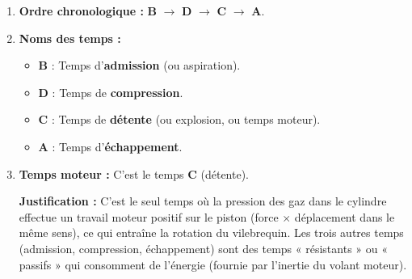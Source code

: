 \documentclass[11pt]{article}
\begin{document}
\begin{corrige}
\begin{enumerate}
\item \textbf{Ordre chronologique :} \textbf{B} $\rightarrow$ \textbf{D} $\rightarrow$ \textbf{C} $\rightarrow$ \textbf{A}.
\item \textbf{Noms des temps :}
      \begin{itemize}
      \item \textbf{B} : Temps d'\textbf{admission} (ou aspiration).
      \item \textbf{D} : Temps de \textbf{compression}.
      \item \textbf{C} : Temps de \textbf{détente} (ou explosion, ou temps moteur).
      \item \textbf{A} : Temps d'\textbf{échappement}.
      \end{itemize}
\item \textbf{Temps moteur :} C'est le temps \textbf{C} (détente).
      \par \textbf{Justification :} C'est le seul temps où la pression des gaz dans le cylindre effectue un travail moteur positif sur le piston (force $\times$ déplacement dans le même sens), ce qui entraîne la rotation du vilebrequin. Les trois autres temps (admission, compression, échappement) sont des temps « résistants » ou « passifs » qui consomment de l'énergie (fournie par l'inertie du volant moteur).
\end{enumerate}
\end{corrige}
\end{document}

